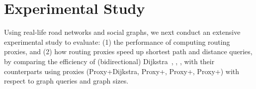 \section{Experimental Study}
\label{sec-expt}



Using real-life road networks and social graphs, we next conduct an extensive experimental study to evaluate: (1) the performance of computing routing proxies, and (2) how routing proxies speed up shortest  path and distance queries, by comparing the efficiency of (bidirectional) Dijkstra~\cite{LubyR89}, \arcflag \cite{MohringSSWW05}, \tnr \cite{arz2013transit}, \ah \cite{zhu2013shortest} with their counterparts using proxies (Proxy+Dijkstra, Proxy+\arcflag, Proxy+\tnr, Proxy+\ah) with respect to graph queries and graph sizes.



